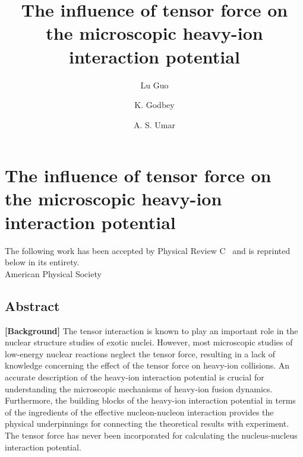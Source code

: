 
\chapter{The influence of tensor force on the microscopic heavy-ion interaction potential}\label{chapters:chapter_4}

\title{The influence of tensor force on the microscopic heavy-ion interaction potential}

\author[1,2]{Lu Guo}
\author[3]{K. Godbey}
\author[3]{A. S. Umar}


{
	\bfseries\centering

	\makeatletter

	\begin{center}
		\AB@authlist
		
		\AB@affillist
	\end{center}
	\makeatother
	
		The following work has been accepted by Physical Review C~\citep{guo2018b} and is reprinted below in its entirety.\\
	 American Physical Society\\
}
\makeatletter
\renewcommand{\AB@affillist}{}
\renewcommand{\AB@authlist}{}
\setcounter{authors}{0}
\setcounter{affil}{0}
\makeatother

\section{Abstract}

		{\bf [Background]}
		The tensor interaction is known to play an important role in the nuclear structure studies of exotic nuclei.
		However, most microscopic studies of low-energy nuclear reactions
		neglect the tensor force, resulting in a lack of knowledge concerning the effect of the tensor force on heavy-ion collisions.
		An accurate description of the heavy-ion interaction
		potential is crucial for understanding the microscopic mechanisms of heavy-ion fusion dynamics.
		Furthermore, the building blocks of the heavy-ion interaction potential in terms of the ingredients of the
		effective nucleon-nucleon interaction provides the physical underpinnings for connecting the theoretical
		results with experiment.
		The tensor force has never been
		incorporated for calculating the nucleus-nucleus interaction potential.
		
